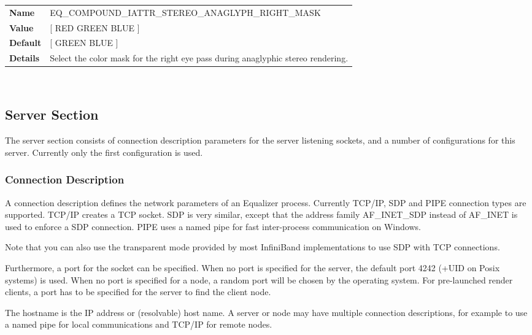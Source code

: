 \documentclass[10pt,a4]{scrartcl}
\begin{document}
\begin{center}
\begin{tabularx}{\textwidth}{|l|X|}
  \hline
  \textbf{Name} & EQ\_COMPOUND\_IATTR\_STEREO\_ANAGLYPH\_RIGHT\_MASK\\
  \textbf{Value} & [ RED GREEN BLUE ]\\
  \textbf{Default} & [ GREEN BLUE ]\\
  \textbf{Details} & Select the color mask for the right eye pass during
  anaglyphic stereo rendering.\\
  \hline
\end{tabularx}\\%
\end{center}

\subsection{Server Section}

The server section consists of connection description parameters for the
server listening sockets, and a number of configurations for this
server. Currently only the first configuration is used.

\subsubsection{\label{sConnectionDescription}Connection Description}

A connection description defines the network parameters of an Equalizer
process. Currently TCP/IP, SDP and PIPE connection types are
supported. TCP/IP creates a TCP socket. SDP is very similar, except that
the address family \textsf{AF\_INET\_SDP} instead of \textsf{AF\_INET}
is used to enforce a SDP connection. PIPE uses a named pipe for fast
inter-process communication on Windows.

Note that you can also use the transparent mode provided by most
InfiniBand implementations to use SDP with TCP connections.

Furthermore, a port for the socket can be specified. When no port is
specified for the server, the default port 4242 (+UID on Posix systems)
is used. When no port is specified for a node, a random port will be
chosen by the operating system. For pre-launched render clients, a port
has to be specified for the server to find the client node.

The hostname is the IP address or (resolvable) host name. A server or
node may have multiple connection descriptions, for example to use a
named pipe for local communications and TCP/IP for remote nodes.
\end{document}
